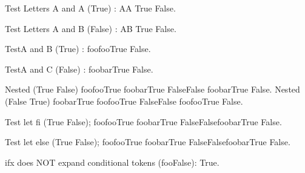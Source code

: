 \documentclass{article}
\begin{document}
\def\testA{foo}
\def\testB{foo}
\def\testC{bar}

Test Letters A and A (True) : \ifx AA True \else False\fi.

Test Letters A and B (False) : \ifx AB True \else False\fi.

TestA and B (True) : \ifx\testA\testB True \else False\fi.

TestA and C (False) : \ifx\testA\testC True \else False\fi.

Nested (True False)
\ifx\testA\testB True \ifx\testA\testC True \else False\fi \else False \ifx\testA\testC True \else False\fi\fi.
Nested (False True)
\ifx\testA\testC True \ifx\testA\testB True \else False\fi \else False \ifx\testA\testB True \else False\fi\fi.

\let\endif\fi
Test let fi (True False); 
\ifx\testA\testB True \ifx\testA\testC True \else False\endif \else False\ifx\testA\testC True \else False\endif\endif.

\let\otherwise\else
Test let else (True False); 
\ifx\testA\testB True \ifx\testA\testC True \otherwise False\endif \otherwise False\ifx\testA\testC True \otherwise False\endif\endif.


ifx does NOT expand conditional tokens (fooFalse): \ifx\iftrue\testA True\else\testB False\fi.
\end{document}
